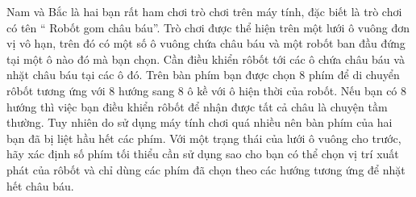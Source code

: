 Nam và  Bắc là hai bạn rất ham chơi trò chơi trên máy tính, đặc biết là trò chơi có tên “ Robốt gom châu báu”. Trò chơi được thể hiện trên một lưới ô vuông đơn vị vô hạn, trên đó có một số ô vuông chứa châu báu và một robốt ban đầu đứng tại một ô nào đó mà bạn chọn. Cần điều khiển rôbốt tới các ô chứa châu báu và nhặt châu báu tại các ô đó. Trên bàn phím bạn được chọn 8 phím để di chuyển rôbốt tương ứng với 8 hướng sang 8 ô kề với ô hiện thời của robốt. Nếu bạn có 8 hướng thì việc bạn điều khiển rôbốt để nhận được tất cả châu là chuyện tầm thường. Tuy nhiên do sử dụng máy tính chơi quá nhiều nên bàn phím của hai bạn đã bị liệt hầu hết các phím.
Với một trạng thái của lưới ô vuông cho trước, hãy xác định số phím tối thiểu cần sử dụng sao cho bạn có thể chọn vị trí xuất phát của rôbốt và chỉ dùng các phím đã chọn theo các hướng tương ứng để nhặt hết châu báu.